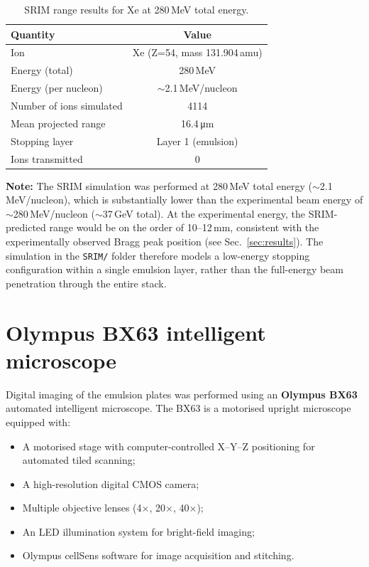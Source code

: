 \documentclass[12pt,a4paper]{article}
\begin{document}
\begin{table}[H]
\centering
\caption{SRIM range results for Xe at 280\,MeV total energy.}
\label{tab:srim_results}
\begin{tabular}{lc}
\toprule
Quantity & Value \\
\midrule
Ion & Xe (Z=54, mass 131.904\,amu) \\
Energy (total) & 280\,MeV \\
Energy (per nucleon) & $\sim$2.1\,MeV/nucleon \\
Number of ions simulated & 4114 \\
Mean projected range & 16.4\,\si{\micro\meter} \\
Stopping layer & Layer 1 (emulsion) \\
Ions transmitted & 0 \\
\bottomrule
\end{tabular}
\end{table}

\vspace{1em}
\noindent
\textbf{Note:} The SRIM simulation was performed at 280\,MeV total
energy ($\sim$2.1\,MeV/nucleon), which is substantially lower than the
experimental beam energy of $\sim$280\,MeV/nucleon
($\sim$37\,GeV total). At the experimental energy, the SRIM-predicted
range would be on the order of 10--12\,mm, consistent with the
experimentally observed Bragg peak position (see Sec.~\ref{sec:results}).
The simulation in the \texttt{SRIM/} folder therefore models a
low-energy stopping configuration within a single emulsion layer,
rather than the full-energy beam penetration through the entire stack.

\section{Olympus BX63 intelligent microscope}
\label{sec:microscope}

Digital imaging of the emulsion plates was performed using an
\textbf{Olympus BX63} automated intelligent microscope.
The BX63 is a motorised upright microscope equipped with:

\begin{itemize}
  \item A motorised stage with computer-controlled X--Y--Z positioning
        for automated tiled scanning;
  \item A high-resolution digital CMOS camera;
  \item Multiple objective lenses (4$\times$, 20$\times$, 40$\times$);
  \item An LED illumination system for bright-field imaging;
  \item Olympus cellSens software for image acquisition and stitching.
\end{itemize}
\end{document}
